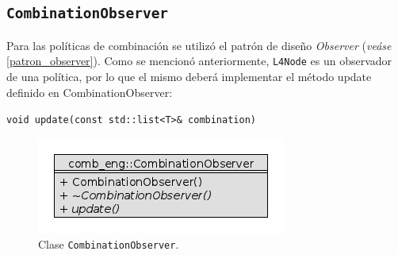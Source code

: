 		\subsection{\texttt{CombinationObserver}}
      Para las pol\'iticas de combinaci\'on se utiliz\'o el patr\'on de dise\~no \textit{Observer} (\textit{ve\'ase} \ref{patron_observer}). Como se
      mencion\'o anteriormente, \texttt{L4Node} es un observador de una pol\'itica, por lo que el mismo deber\'a implementar el m\'etodo update
      definido en CombinationObserver:
      \begin{description}
        \item \texttt{void update(const std::list<T>\& combination)}
      \end{description}
				\begin{figure}[H] \hspace{3.6cm}
    	   	\includegraphics[scale=.56]{images/combination_observer_class.png}
          \caption{Clase \texttt{CombinationObserver}.}
		      \label{combObserverClass}
        \end{figure}
